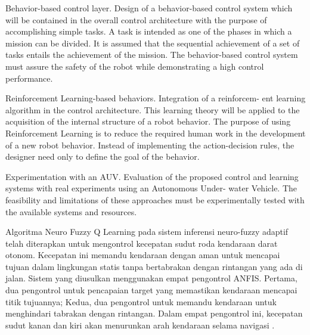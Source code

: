 

Behavior-based control layer. Design of a behavior-based control system which will be contained in the overall control architecture with the purpose of accomplishing simple tasks. A task is intended as one of the phases in which a mission can be divided. It is assumed that the sequential achievement of a set of tasks entails the achievement of the mission. The behavior-based control system must assure the safety of the robot while demonstrating a high control performance.

Reinforcement Learning-based behaviors. Integration of a reinforcem- ent learning algorithm in the control architecture. This learning theory will be applied to the acquisition of the internal structure of a robot behavior. The purpose of using Reinforcement Learning is to reduce the required human work in the development of a new robot behavior. Instead of implementing the action-decision rules, the designer need only to define the goal of the behavior.

Experimentation with an AUV. Evaluation of the proposed control and learning systems with real experiments using an Autonomous Under- water Vehicle. The feasibility and limitations of these approaches must be experimentally tested with the available systems and resources.


Algoritma Neuro Fuzzy Q Learning pada sistem inferensi neuro-fuzzy adaptif telah diterapkan untuk mengontrol kecepatan sudut roda kendaraan darat otonom. Kecepatan ini memandu kendaraan dengan aman untuk mencapai tujuan dalam lingkungan statis tanpa bertabrakan dengan rintangan yang ada di jalan. Sistem yang diusulkan menggunakan empat pengontrol ANFIS. Pertama, dua pengontrol untuk pencapaian target yang memastikan kendaraan mencapai titik tujuannya; Kedua, dua pengontrol untuk memandu kendaraan untuk menghindari tabrakan dengan rintangan. Dalam empat pengontrol ini, kecepatan sudut kanan dan kiri akan menurunkan arah kendaraan selama navigasi \cite{Al-mayyahi2014}.
      

